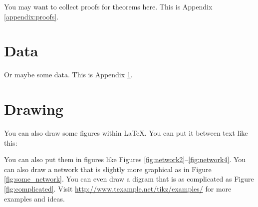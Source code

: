 \documentclass[letterpaper, 11pt]{article}
\begin{document}
You may want to collect proofs for theorems here.
This is Appendix \ref{appendix:proofs}.

\section{Data} \label{appendix:data}

Or maybe some data. This is Appendix \ref{appendix:data}.

\section{Drawing} \label{appendix:drawing}

You can also draw some figures within LaTeX.
You can put it between text like this:
\begin{center}
\end{center}
You can also put them in figures like Figures \ref{fig:network2}--\ref{fig:network4}.
You can also draw a network that is slightly more graphical as in Figure \ref{fig:some_network}.
You can even draw a digram that is as complicated as Figure \ref{fig:complicated}.
Visit \url{http://www.texample.net/tikz/examples/} for more examples and ideas.
\end{document}
